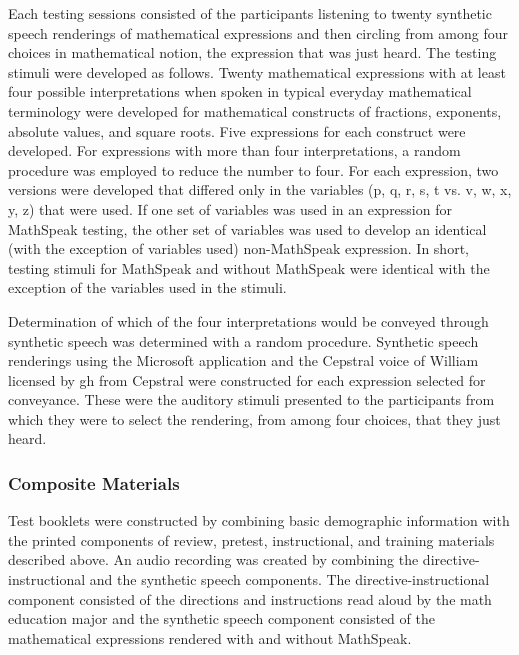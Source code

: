 \documentclass[11.5pt]{sig-alternate} %
\begin{document}
\begin{large}
Each testing sessions consisted of the participants listening to twenty synthetic speech renderings of mathematical expressions and then circling from among four choices in mathematical notion, the expression that was just heard. The testing stimuli were developed as follows. Twenty mathematical expressions with at least four possible interpretations when spoken in typical everyday mathematical terminology were developed for mathematical constructs of fractions, exponents, absolute values, and square roots. Five expressions for each construct were developed. For expressions with more than four interpretations, a random procedure was employed to reduce the number to four. For each expression, two versions were developed that differed only in the variables (p, q, r, s, t vs. v, w, x, y, z) that were used. If one set of variables was used in an expression for MathSpeak testing, the other set of variables was used to develop an identical (with the exception of variables used) non-MathSpeak expression. In short, testing stimuli for MathSpeak and without MathSpeak were identical with the exception of the variables used in the stimuli.

Determination of which of the four interpretations would be conveyed through synthetic speech was determined with a random procedure. Synthetic speech renderings using the Microsoft application and the Cepstral voice of William licensed by gh from Cepstral were constructed for each expression selected for conveyance. These were the auditory stimuli presented to the participants from which they were to select the rendering, from among four choices, that they just heard.

\subsubsection*{Composite Materials}
Test booklets were constructed by combining basic demographic information with the printed components of review, pretest, instructional, and training materials described above. An audio recording was created by combining the directive-instructional and the synthetic speech components. The directive-instructional component consisted of the directions and instructions read aloud by the math education major and the synthetic speech component consisted of the mathematical expressions rendered with and without MathSpeak.


\end{large}
\end{document}
